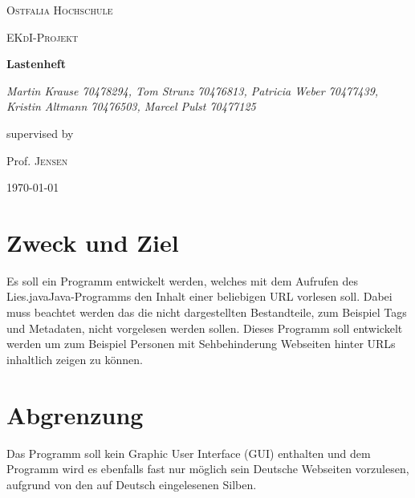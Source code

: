 \documentclass[12pt]{scrartcl}
\begin{document}
\begin{titlepage}
	\centering
	{\scshape\LARGE Ostfalia Hochschule \par}
	\vspace{1cm}
	{\scshape\Large EKdI-Projekt\par}
	\vspace{1.5cm}
	{\huge\bfseries Lastenheft\par}
	\vspace{2cm}
	{\Large\itshape Martin Krause 70478294, Tom Strunz 70476813, Patricia Weber 70477439, Kristin Altmann 70476503, Marcel Pulst 70477125\par}
	\vfill
	supervised by\par
	Prof. \textsc{Jensen}

	\vfill

	{\large \today\par}
\end{titlepage}


\tableofcontents
\newpage


\section{Zweck und Ziel}
Es soll ein Programm entwickelt werden, welches mit dem Aufrufen des \glqq Lies.java\grqq Java-Programms den Inhalt einer beliebigen URL vorlesen soll. Dabei muss beachtet werden das die nicht dargestellten Bestandteile, zum Beispiel Tags und Metadaten, nicht vorgelesen werden sollen. Dieses Programm soll entwickelt werden um zum Beispiel Personen mit Sehbehinderung Webseiten hinter URLs inhaltlich zeigen zu können.

\section{Abgrenzung}
Das Programm soll kein Graphic User Interface (GUI) enthalten und dem Programm wird es ebenfalls fast nur möglich sein Deutsche Webseiten vorzulesen, aufgrund von den auf Deutsch eingelesenen Silben.
\end{document}
